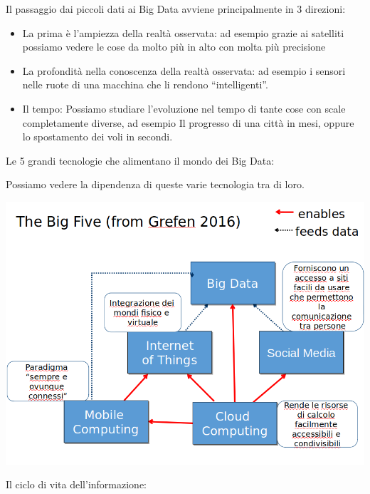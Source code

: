\documentclass[a4page, 11pt]{article}
\begin{document}
Il passaggio dai piccoli dati ai Big Data avviene principalmente in 3
direzioni:

\begin{itemize}
	 
	\item
	La prima è l'ampiezza della realtà osservata: ad esempio grazie ai
	satelliti possiamo vedere le cose da molto più in alto con molta più
	precisione
	\item
	La profondità nella conoscenza della realtà osservata: ad esempio i
	sensori nelle ruote di una macchina che li rendono ``intelligenti''.
	\item
	Il tempo: Possiamo studiare l'evoluzione nel tempo di tante cose con
	scale completamente diverse, ad esempio Il progresso di una città in
	mesi, oppure lo spostamento dei voli in secondi.
\end{itemize}

Le 5 grandi tecnologie che alimentano il mondo dei Big Data:

Possiamo vedere la dipendenza di queste varie tecnologia tra di loro.
\begin{center}
	\includegraphics[scale=0.4]{image7.png}
\end{center}

Il ciclo di vita dell'informazione:
\end{document}
